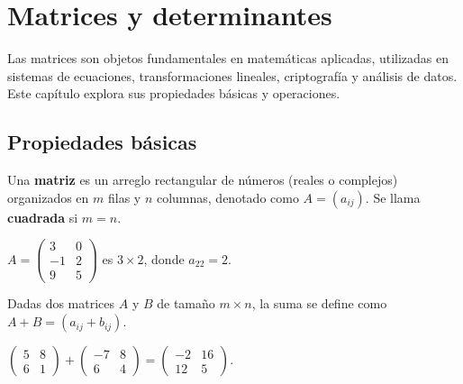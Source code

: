\chapter{Matrices y determinantes}\label{matrdet}
Las matrices son objetos fundamentales en matemáticas aplicadas, utilizadas en sistemas de ecuaciones, transformaciones lineales, criptografía y análisis de datos. Este capítulo explora sus propiedades básicas y operaciones.

\section{Propiedades básicas}

\begin{definition}[Matriz] Una \textbf{matriz} es un arreglo rectangular de números (reales o complejos) organizados en $m$ filas y $n$ columnas, denotado como $A = (a_{ij})$. Se llama \textbf{cuadrada} si $m = n$.
\end{definition}

\begin{example} $A = \begin{pmatrix} 3 & 0 \\ -1 & 2 \\ 9 & 5 \end{pmatrix}$ es $3 \times 2$, donde $a_{22} = 2$.
\end{example}

\begin{definition} Dadas dos matrices $A$ y $B$ de tamaño $m \times n$, la suma se define como $A + B = (a_{ij} + b_{ij})$.
\end{definition}

\begin{example} $\begin{pmatrix} 5 & 8 \\ 6 & 1 \end{pmatrix} + \begin{pmatrix} -7 & 8 \\ 6 & 4 \end{pmatrix} = \begin{pmatrix} -2 & 16 \\ 12 & 5 \end{pmatrix}.$
\end{example}

